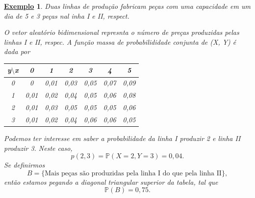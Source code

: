 \documentclass{article}
\newtheorem{example}{\underline{Exemplo}}
\begin{document}
\begin{example}
  Duas linhas de produção fabricam peças com uma capacidade em um dia de 5 e 3 peças nal inha I e II, respect.

  O vetor aleatório bidimensional represnta o número de preças produzidas pelas linhas I e II, respec. A função massa de probabilididade conjunta
  de (X, Y) é dada por
  \begin{center}
    \begin{table}[h!]
      \centering
      \begin{tabular}{| c | c | c | c | c | c | c |}
        \hline
        y\(\setminus\)x & 0 & 1 & 2 & 3 & 4 & 5\\
        \hline
        0 & 0 & 0,01 & 0,03 & 0,05 & 0,07 & 0,09\\
        1 & 0,01 & 0,02 & 0,04 & 0,05 & 0,06 & 0,08\\
        2 & 0,01 & 0,03 & 0,05 & 0,05 & 0,05 & 0,06\\
        3 & 0,01 & 0,02 & 0,04 & 0,06 & 0,06 & 0,05\\
        \hline
      \end{tabular}
    \end{table}
  \end{center}
  Podemos ter interesse em saber a probabilidade da linha I produzir 2 e linha II produzir 3. Neste caso, 
  \[
    p(2, 3) = \mathbb{P}(X=2, Y = 3) = 0,04.
  \]
  Se definirmos 
  \[
    B = \{\text{Mais peças são produzidas pela linha I do que pela linha II}\},
  \]
  então estamos pegando a diagonal triangular superior da tabela, tal que 
  \[
    \mathbb{P}(B) = 0,75.
  \]
\end{example}
\end{document}
